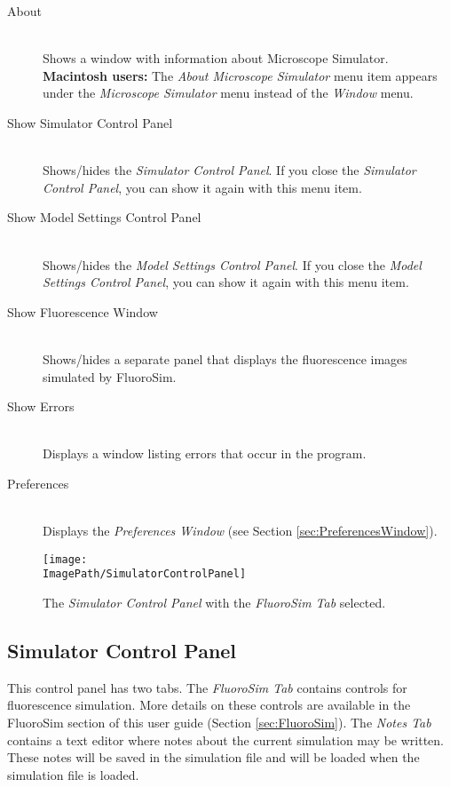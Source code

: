 \documentclass[11pt,titlepage,twoside]{article}
\begin{document}
\begin{description}

  \item[About] \hfill \\
  Shows a window with information about Microscope Simulator. \textbf{Macintosh users:} The \emph{About Microscope Simulator} menu item appears under the \emph{Microscope Simulator} menu instead of the \emph{Window} menu. 

  \item[Show Simulator Control Panel] \hfill \\
  Shows/hides the \emph{Simulator Control Panel}. If you close the \emph{Simulator Control Panel}, you can show it again with this menu item.
  
  \item[Show Model Settings Control Panel] \hfill \\
    Shows/hides the \emph{Model Settings Control Panel}. If you close the \emph{Model Settings Control Panel}, you can show it again with this menu item.
  
  \item[Show Fluorescence Window] \hfill \\
  Shows/hides a separate panel that displays the fluorescence images simulated by FluoroSim.
  
  \item[Show Errors] \hfill \\
  Displays a window listing errors that occur in the program.
  
  \item[Preferences] \hfill \\
  Displays the \emph{Preferences Window} (see Section \ref{sec:PreferencesWindow}).

\end{description}

\begin{figure}[htbp] %
   \centering
   \texttt{[image: \\ImagePath/SimulatorControlPanel]} 
   \caption{The \emph{Simulator Control Panel} with the \emph{FluoroSim Tab} selected.}
   \label{fig:SimulatorControlPanel}
\end{figure}

\subsection{Simulator Control Panel}

This control panel has two tabs. The \emph{FluoroSim Tab} contains controls for fluorescence simulation. More details on these controls are available in the FluoroSim section of this user guide (Section \ref{sec:FluoroSim}). The \emph{Notes Tab} contains a text editor where notes about the current simulation may be written. These notes will be saved in the simulation file and will be loaded when the simulation file is loaded.
\end{document}
